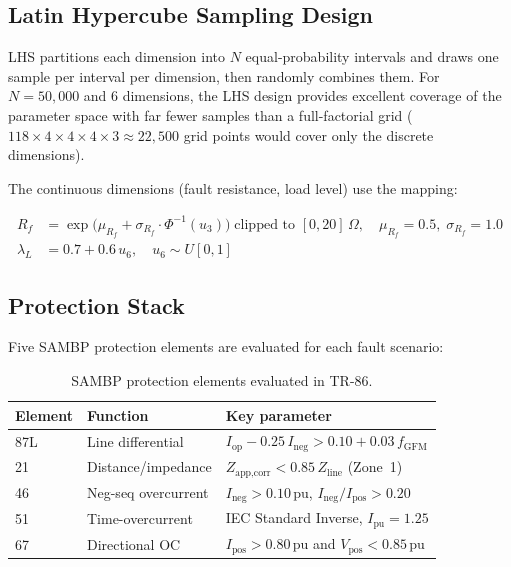 \documentclass[11pt,a4paper]{article}
\newcommand{\pu}{\,\text{pu}}
\begin{document}
\subsection{Latin Hypercube Sampling Design}

LHS partitions each dimension into $N$ equal-probability intervals and
draws one sample per interval per dimension, then randomly combines them.
For $N = 50{,}000$ and 6 dimensions, the LHS design provides excellent
coverage of the parameter space with far fewer samples than a full-factorial
grid ($118 \times 4 \times 4 \times 4 \times 3 \approx 22{,}500$ grid points
would cover only the discrete dimensions).

The continuous dimensions (fault resistance, load level) use the mapping:

\begin{align}
  R_f &= \exp\bigl(\mu_{R_f} + \sigma_{R_f} \cdot \Phi^{-1}(u_3)\bigr)
         \;\text{clipped to } [0,20]\,\Omega, \quad
         \mu_{R_f}=0.5,\; \sigma_{R_f}=1.0 \label{eq:Rf_lognormal}\\
  \lambda_L &= 0.7 + 0.6\, u_6, \quad u_6 \sim U[0,1] \label{eq:load_lhs}
\end{align}

\subsection{Protection Stack}

Five SAMBP protection elements are evaluated for each fault scenario:

\begin{table}[H]
\centering
\caption{SAMBP protection elements evaluated in TR-86.}
\label{tab:elements}
\begin{tabular}{lll}
\toprule
Element & Function & Key parameter \\
\midrule
87L & Line differential   & $I_{\text{op}} - 0.25\,I_{\text{neg}} > 0.10 + 0.03\,f_{\text{GFM}}$ \\
21  & Distance/impedance  & $Z_{\text{app,corr}} < 0.85\,Z_{\text{line}}$ (Zone~1) \\
46  & Neg-seq overcurrent & $I_{\text{neg}} > 0.10\pu$, $I_{\text{neg}}/I_{\text{pos}} > 0.20$ \\
51  & Time-overcurrent    & IEC Standard Inverse, $I_{\text{pu}} = 1.25$ \\
67  & Directional OC      & $I_{\text{pos}} > 0.80\pu$ and $V_{\text{pos}} < 0.85\pu$ \\
\bottomrule
\end{tabular}
\end{table}
\end{document}
